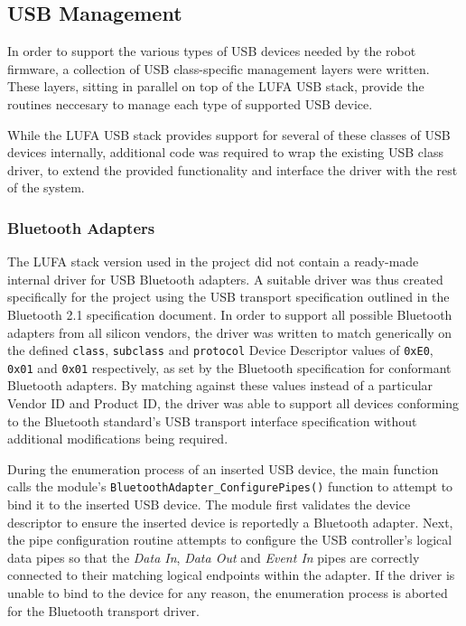 \FloatBarrier
\subsection{USB Management}

In order to support the various types of USB devices needed by the robot firmware, a collection of USB class-specific management layers were written. These layers, sitting in parallel on top of the LUFA USB stack, provide the routines neccesary to manage each type of supported USB device.

While the LUFA USB stack provides support for several of these classes of USB devices internally, additional code was required to wrap the existing USB class driver, to extend the provided functionality and interface the driver with the rest of the system.

\FloatBarrier
\subsubsection{Bluetooth Adapters}

The LUFA stack version used in the project did not contain a ready-made internal driver for USB Bluetooth adapters. A suitable driver was thus created specifically for the project using the USB transport specification outlined in the Bluetooth 2.1 specification document. In order to support all possible Bluetooth adapters from all silicon vendors, the driver was written to match generically on the defined \texttt{class}, \texttt{subclass} and \texttt{protocol} Device Descriptor values of \texttt{0xE0}, \texttt{0x01} and \texttt{0x01} respectively, as set by the Bluetooth specification for conformant Bluetooth adapters. By matching against these values instead of a particular Vendor ID and Product ID, the driver was able to support all devices conforming to the Bluetooth standard's USB transport interface specification without additional modifications being required.

During the enumeration process of an inserted USB device, the main function calls the module's \lstinline{BluetoothAdapter_ConfigurePipes()} function to attempt to bind it to the inserted USB device. The module first validates the device descriptor to ensure the inserted device is reportedly a Bluetooth adapter. Next, the pipe configuration routine attempts to configure the USB controller's logical data pipes so that the \textit{Data In}, \textit{Data Out} and \textit{Event In} pipes are correctly connected to their matching logical endpoints within the adapter. If the driver is unable to bind to the device for any reason, the enumeration process is aborted for the Bluetooth transport driver.

